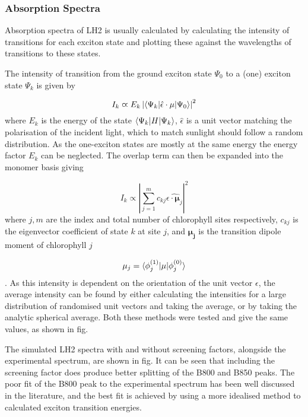 \subsubsection{Absorption Spectra}
\label{subsubsec:abs_spec}

Absorption spectra of LH2 is usually calculated by calculating the intensity of 
transitions for each exciton state and plotting these against the wavelengths of
transitions to these states. 

The intensity of transition from the ground exciton state $\Psi_0$ to a (one) exciton
state $\Psi_k$ is given by

\begin{equation}
    I_k \varpropto E_k \left\lvert \braket{\Psi_k| \hat{\epsilon} \cdot \mathbf{\mu} | \Psi_0} \right\rvert^2
\end{equation}
%
where $E_k$ is the energy of the state $\braket{\Psi_k|H|\Psi_k}$, $\hat{\epsilon}$
is a unit vector matching the polarisation of the incident light, which to match
sunlight should follow a random distribution. As the one-exciton states are mostly
at the same energy the energy factor $E_k$ can be neglected. The overlap term can
then be expanded into the monomer basis giving

\begin{equation}
    I_k \varpropto \left\lvert \sum^m_{j=1} c_{kj} \hat{\epsilon \cdot \mathbf{\mu}_j }\right\rvert^2
\end{equation}
%
where $j,m$ are the index and total number of chlorophyll sites respectively, $c_{kj}$
is the eigenvector coefficient of state $k$ at site $j$, and $\mathbf{\mu_j}$ is 
the transition dipole moment of chlorophyll $j$ 

\begin{equation}
    \mathbf{\mu}_j = \braket{\phi_j^{\left(1\right)}|\mathbf{\mu}|\phi_j^{\left(0\right)}}
\end{equation}
%
. As this intensity is dependent on the orientation of the unit vector $\epsilon$,
the average intensity can be found by either calculating the intensities for a large
distribution of randomised unit vectors and taking the average, or by taking the
analytic spherical average. Both these methods were tested and give the same values,
as shown in fig.

The simulated LH2 spectra with and without screening factors, alongside the experimental 
spectrum, are shown in fig. It can be seen that including the screening factor does 
produce better splitting of the B800 and B850 peaks. The poor fit of the B800 peak 
to the experimental spectrum has been well discussed in the literature, and the best
fit is achieved by using a more idealised method to calculated exciton transition
energies.

